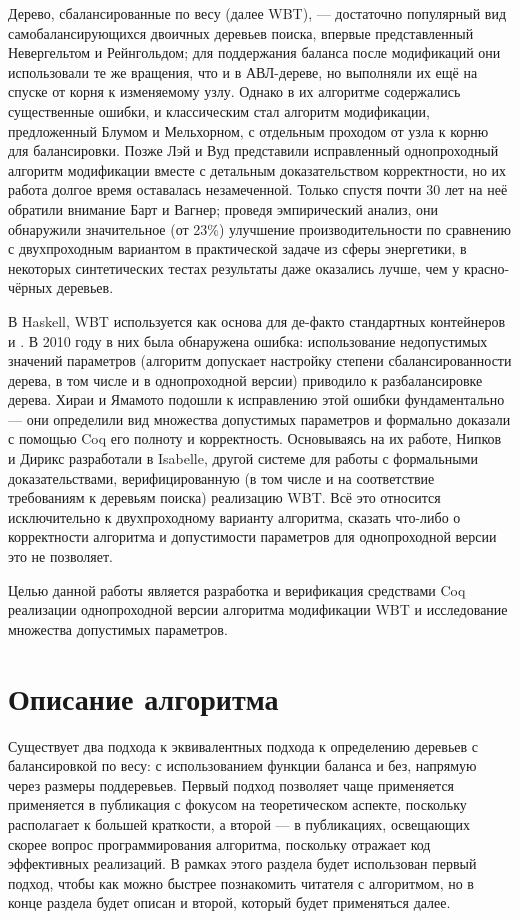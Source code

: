 \documentclass[a4paper,14pt]{extarticle}
\begin{document}
Дерево, сбалансированные по весу (далее WBT), --- достаточно популярный вид
самобалансирующихся двоичных деревьев поиска,
впервые представленный Невергельтом и Рейнгольдом\cite{nievergelt};
для поддержания баланса после модификаций они использовали
те же вращения, что и в АВЛ-дереве\cite{avl},
но выполняли их ещё на спуске от корня к изменяемому узлу.
Однако в их алгоритме содержались существенные ошибки,
и классическим стал алгоритм модификации,
предложенный Блумом и Мельхорном\cite{blum},
с отдельным проходом от узла к корню для балансировки.
Позже Лэй и Вуд представили исправленный
однопроходный алгоритм модификации
вместе с детальным доказательством корректности\cite{lai},
но их работа долгое время оставалась незамеченной.
Только спустя почти 30 лет на неё обратили внимание
Барт и Вагнер;
проведя эмпирический анализ, они обнаружили
значительное (от 23\%) улучшение производительности
по сравнению с двухпроходным вариантом в практической задаче из сферы энергетики,
в некоторых синтетических тестах
результаты даже оказались лучше, чем у красно-чёрных деревьев\cite{barth}.

В Haskell, WBT используется как основа для
де-факто стандартных контейнеров  и .
В 2010 году в них была обнаружена ошибка:
использование недопустимых значений параметров
(алгоритм допускает настройку степени сбалансированности дерева,
в том числе и в однопроходной версии)
приводило к разбалансировке дерева.
Хираи и Ямамото подошли к исправлению этой ошибки фундаментально ---
они определили вид множества допустимых параметров
и формально доказали с помощью Coq его полноту и корректность\cite{hirai}.
Основываясь на их работе,
Нипков и Дирикс разработали в Isabelle,
другой системе для работы с формальными доказательствами,
верифицированную (в том числе и на соответствие требованиям к деревьям поиска)
реализацию WBT\cite{nipkow}.
Всё это относится исключительно
к двухпроходному варианту алгоритма,
сказать что-либо о корректности алгоритма и допустимости параметров
для однопроходной версии это не позволяет.

Целью данной работы является
разработка и верификация средствами Coq
реализации однопроходной версии алгоритма модификации WBT
и исследование множества допустимых параметров.

\clearpage
\section{Описание алгоритма}

Существует два подхода к эквивалентных подхода
к определению деревьев с балансировкой по весу:
с использованием функции баланса и
без, напрямую через размеры поддеревьев.
Первый подход позволяет чаще применяется
применяется в публикация с фокусом на теоретическом аспекте,
поскольку располагает к большей краткости,
а второй --- в публикациях,
освещающих скорее вопрос программирования алгоритма,
поскольку отражает код эффективных реализаций.
В рамках этого раздела
будет использован первый подход,
чтобы как можно быстрее познакомить читателя с алгоритмом,
но в конце раздела будет описан и второй,
который будет применяться далее.
\end{document}
